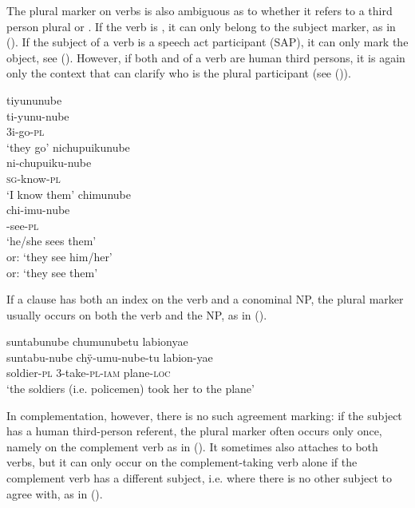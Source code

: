 The plural marker on verbs is also ambiguous as to whether it refers to a third person plural  or . If the verb is , it can only belong to the subject marker, as in (). If the subject of a  verb is a speech act participant (SAP), it can only mark the object, see (). However, if both  and  of a  verb are human third persons, it is again only the context that can clarify who is the plural participant (see ()).

\ea\label{ex:FirstPlural-3}
  \ea\label{ex:FirstPlural-3.1}
\begingl
\glpreamble tiyununube\\
\gla ti-yunu-nube\\
\glb 3i-go-\textsc{pl}\\
\glft ‘they go’
\endgl
  \ex\label{ex:FirstPlural-3.2}
\begingl
\glpreamble nichupuikunube\\
\gla ni-chupuiku-nube\\
\textsc{sg}-know-\textsc{pl}\\
\glft ‘I know them’
\endgl
  \ex\label{ex:FirstPlural-3.3}
\begingl
\glpreamble chimunube\\
\gla chi-imu-nube\\
-see-\textsc{pl}\\
\glft ‘he/she sees them’\\or: ‘they see him/her’\\or: ‘they see them’
\endgl
\z
\xe

If a clause has both an index on the verb and a conominal NP, the plural marker usually occurs on both the verb and the NP, as in ().

\ea\label{ex:agr-aff}
\begingl
\glpreamble suntabunube chumunubetu labionyae\\
\gla suntabu-nube chÿ-umu-nube-tu labion-yae\\
\glb soldier-\textsc{pl} 3-take-\textsc{pl}-\textsc{iam} plane-\textsc{loc}\\
\glft ‘the soldiers (i.e. policemen) took her to the plane’
\endgl
\trailingcitation{[jxx-p120430l-1.232]}
\xe

In complementation, however, there is no such agreement marking: if the subject has a human third-person referent, the plural marker often occurs only once, namely on the complement verb as in (). It sometimes also attaches to both verbs, but it can only occur on the complement-taking verb alone if the complement verb has a different subject, i.e. where there is no other subject to agree with, as in ().

